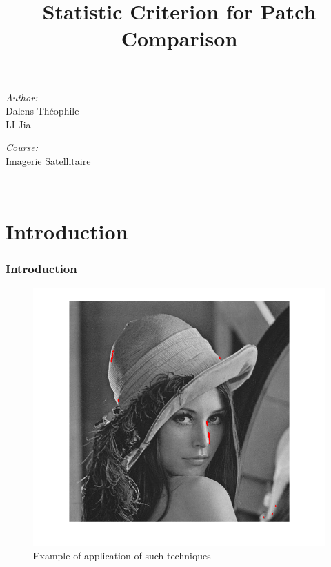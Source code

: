 \documentclass[compress]{beamer} %
\begin{document}
 \title{Statistic Criterion for Patch Comparison}  

 \begin{frame}
\titlepage
    \centering
    \begin{minipage}{0.4\textwidth}
    \begin{flushleft} \large
    \emph{Author:}\\
    Dalens Théophile\\
    LI Jia\\
    
    \end{flushleft}
    \end{minipage}
    \begin{minipage}{0.4\textwidth}
    \begin{flushright} \large
    \emph{Course:}\\
    Imagerie Satellitaire
    \end{flushright}
    \end{minipage}\\[3cm]
 \end{frame}
 \section{Introduction}
 \begin{frame}
  \frametitle{Introduction}
	\begin{figure}[h!]
	\centering
	\begin{minipage}{0.7\linewidth}
	\includegraphics[width=\linewidth]{lena}
	\end{minipage}
	    \caption{Example of application of such techniques}
	\end{figure}
 \end{frame}
\end{document}
